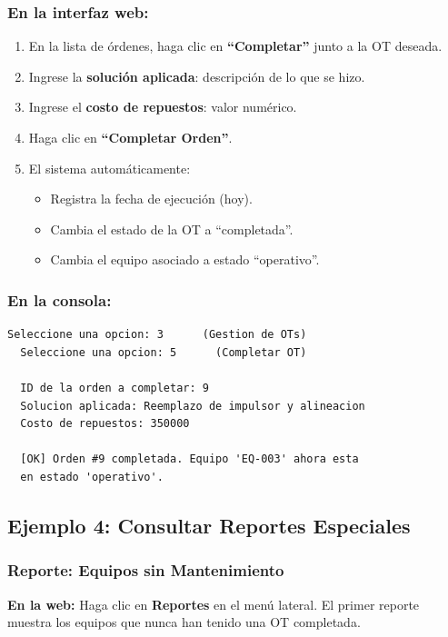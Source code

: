 \documentclass[12pt, a4paper]{article}
\begin{document}
\subsubsection{En la interfaz web:}
\begin{enumerate}[leftmargin=2em]
    \item En la lista de \'ordenes, haga clic en \textbf{``Completar''} junto a la OT deseada.
    \item Ingrese la \textbf{soluci\'on aplicada}: descripci\'on de lo que se hizo.
    \item Ingrese el \textbf{costo de repuestos}: valor num\'erico.
    \item Haga clic en \textbf{``Completar Orden''}.
    \item El sistema autom\'aticamente:
    \begin{itemize}
        \item Registra la fecha de ejecuci\'on (hoy).
        \item Cambia el estado de la OT a ``completada''.
        \item Cambia el equipo asociado a estado ``operativo''.
    \end{itemize}
\end{enumerate}

\subsubsection{En la consola:}
\begin{lstlisting}[style=console]
  Seleccione una opcion: 3      (Gestion de OTs)
  Seleccione una opcion: 5      (Completar OT)

  ID de la orden a completar: 9
  Solucion aplicada: Reemplazo de impulsor y alineacion
  Costo de repuestos: 350000

  [OK] Orden #9 completada. Equipo 'EQ-003' ahora esta 
  en estado 'operativo'.
\end{lstlisting}

\subsection{Ejemplo 4: Consultar Reportes Especiales}

\subsubsection{Reporte: Equipos sin Mantenimiento}

\textbf{En la web:} Haga clic en \textbf{Reportes} en el men\'u lateral. El primer reporte muestra los equipos que nunca han tenido una OT completada.
\end{document}
